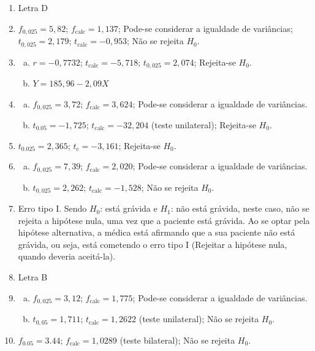 \documentclass[12pt, a4paper]{article}
\begin{document}
\begin{enumerate}
    \item Letra D
    \item $f_{0,025}=5,82$; $f_{\text{calc}}=1,137$; Pode-se considerar a igualdade de variâncias; $t_{0,025}=2,179$; $t_{\text{calc}}=-0,953$; Não se rejeita $H_0$.
    \item
    \begin{enumerate}[a)]
        \item $r=-0,7732$; $t_{\text{calc}}=-5,718$; $t_{0,025}=2,074$; Rejeita-se $H_0$.
        \item $Y=185,96-2,09 X$
    \end{enumerate}
    \item
    \begin{enumerate}[a)]
        \item $f_{0,025}=3,72$; $f_{\text{calc}}=3,624$; Pode-se considerar a igualdade de variâncias.
        \item $t_{0.05}=-1,725$; $t_{\text{calc}}=-32,204$ (teste unilateral); Rejeita-se $H_{0}$.
    \end{enumerate}
    \item $t_{0.025}=2,365$; $t_{\text{c}}=-3,161$; Rejeita-se $H_{0}.$
    \item
    \begin{enumerate}[a)]
        \item $f_{0,025}=7,39$; $f_{\text{calc}}=2,020$; Pode-se considerar a igualdade de variâncias.
        \item $t_{0,025}=2,262$; $t_{\text{calc}}=-1,528$; Não se rejeita $H_{0}$.
    \end{enumerate}
    \item Erro tipo I. Sendo $H_0$: está grávida e $H_1$: não está grávida, neste caso, não se rejeita a hipótese nula, uma vez que a paciente está grávida. Ao se optar pela hipótese alternativa, a médica está afirmando que a sua paciente não está grávida, ou seja, está cometendo o erro tipo I (Rejeitar a hipótese nula, quando deveria aceitá-la).
    \item Letra B
    \item 
    \begin{enumerate}[a)]
        \item $f_{0,025}=3,12$; $f_{\text{calc}}=1,775$; Pode-se considerar a igualdade de variâncias.
        \item $t_{0,05}=1,711$; $t_{\text{calc}}=1,2622$ (teste unilateral); Não se rejeita $H_0$.
    \end{enumerate}
    \item $f_{0.05}=3.44$; $f_{\text{calc}}=1,0289$ (teste bilateral); Não se rejeita $H_0$.

\end{enumerate}
\end{document}
